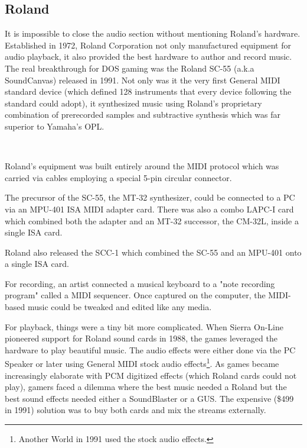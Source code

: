  \subsection{Roland}
 It is impossible to close the audio section without mentioning Roland's hardware. Established in 1972, Roland Corporation not only manufactured equipment for audio playback, it also provided the best hardware to author and record music. The real breakthrough for DOS gaming was the Roland SC-55 (a.k.a SoundCanvas) released in 1991. Not only was it the very first General MIDI standard device (which defined 128 instruments that every device following the standard could adopt), it synthesized music using Roland's proprietary combination of prerecorded samples and subtractive synthesis which was far superior to Yamaha's OPL.\\
 \par
 \\
 \par

Roland's equipment was built entirely around the MIDI protocol which was carried via cables employing a special 5-pin circular connector.\\
\par
 The precursor of the SC-55, the MT-32 synthesizer, could be connected to a PC via an MPU-401 ISA MIDI adapter card. There was also a combo LAPC-I card which combined both the adapter and an MT-32 successor, the CM-32L, inside a single ISA card.\\
\par 
{}
\par
Roland also released the SCC-1 which combined the SC-55 and an MPU-401 onto a single ISA card.\\
\par 
{}
\par
\pagebreak
For recording, an artist connected a musical keyboard to a "note recording program" called a MIDI sequencer. Once captured on the computer, the MIDI-based music could be tweaked and edited like any media.\\

\par
For playback, things were a tiny bit more complicated. When Sierra On-Line pioneered support for Roland sound cards in 1988, the games leveraged the hardware to play beautiful music. The audio effects were either done via the PC Speaker or later using General MIDI stock audio effects\footnote{Another World in 1991 used the stock audio effects.}. As games became increasingly elaborate with PCM digitized effects (which Roland cards could not play), gamers faced a dilemma where the best music needed a Roland but the best sound effects needed either a SoundBlaster or a GUS. The expensive (\$499 in 1991) solution was to buy both cards and mix the streams externally.\\
\par
{}


